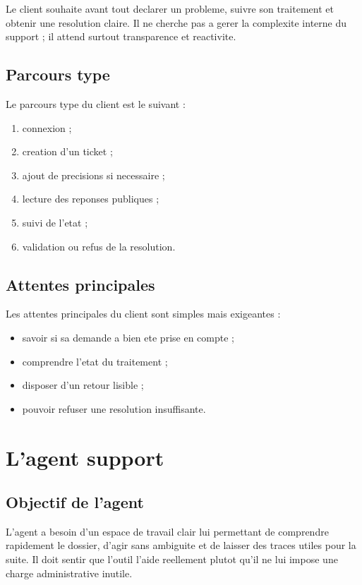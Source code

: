 Le client souhaite avant tout declarer un probleme, suivre son traitement et obtenir une resolution claire. Il ne cherche pas a gerer la complexite interne du support ; il attend surtout transparence et reactivite.

\subsection{Parcours type}

Le parcours type du client est le suivant :

\begin{enumerate}[leftmargin=1.2cm]
  \item connexion ;
  \item creation d'un ticket ;
  \item ajout de precisions si necessaire ;
  \item lecture des reponses publiques ;
  \item suivi de l'etat ;
  \item validation ou refus de la resolution.
\end{enumerate}

\subsection{Attentes principales}

Les attentes principales du client sont simples mais exigeantes :

\begin{itemize}[leftmargin=1.2cm]
  \item savoir si sa demande a bien ete prise en compte ;
  \item comprendre l'etat du traitement ;
  \item disposer d'un retour lisible ;
  \item pouvoir refuser une resolution insuffisante.
\end{itemize}

\section{L'agent support}

\subsection{Objectif de l'agent}

L'agent a besoin d'un espace de travail clair lui permettant de comprendre rapidement le dossier, d'agir sans ambiguite et de laisser des traces utiles pour la suite. Il doit sentir que l'outil l'aide reellement plutot qu'il ne lui impose une charge administrative inutile.

